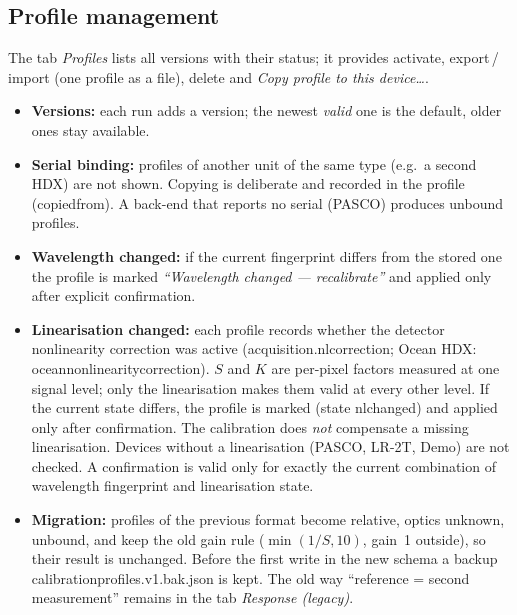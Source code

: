 \documentclass[12pt,a4paper]{article}
\DeclareRobustCommand{\code}[1]{{\ttfamily\small\def\_{\rawus\allowbreak}#1}}
\DeclareRobustCommand{\file}[1]{{\ttfamily\small\def\_{\rawus\allowbreak}#1}}
\DeclareRobustCommand{\key}[1]{{\ttfamily\small\color{acc2}\def\_{\rawus\allowbreak}#1}}
\begin{document}
\subsection{Profile management}\label{sec:speccal-profiles}
The tab \emph{Profiles} lists all versions with their status; it provides
activate, export\,/\,import (one profile as a file), delete and
\emph{Copy profile to this device\ldots}.
\begin{itemize}
  \item \textbf{Versions:} each run adds a version; the newest \emph{valid} one is
        the default, older ones stay available.
  \item \textbf{Serial binding:} profiles of another unit of the same type
        (e.g.\ a second HDX) are not shown. Copying is deliberate and recorded in
        the profile (\code{copied\_from}). A back-end that reports no serial
        (PASCO) produces unbound profiles.
  \item \textbf{Wavelength changed:} if the current fingerprint differs from the
        stored one the profile is marked \emph{``Wavelength changed --- recalibrate''}
        and applied only after explicit confirmation.
  \item \textbf{Linearisation changed:} each profile records whether the
        detector nonlinearity correction was active
        (\code{acquisition.nl\_correction}; Ocean HDX:
        \key{ocean\_nonlinearity\_correction}). $S$ and $K$ are per-pixel factors
        measured at one signal level; only the linearisation makes them valid at
        every other level. If the current state differs, the profile is marked
        (state \code{nl\_changed}) and applied only after confirmation. The
        calibration does \emph{not} compensate a missing linearisation. Devices
        without a linearisation (PASCO, LR-2T, Demo) are not checked.
        A confirmation is valid only for exactly the current combination of
        wavelength fingerprint and linearisation state.
  \item \textbf{Migration:} profiles of the previous format become
        \code{relative}, optics \code{unknown}, unbound, and keep the old gain
        rule ($\min(1/S,10)$, gain~1 outside), so their result is unchanged.
        Before the first write in the new schema a backup
        \file{calibration\_profiles.v1.bak.json} is kept. The old way
        ``reference = second measurement'' remains in the tab \emph{Response
        (legacy)}.
\end{itemize}
\end{document}
